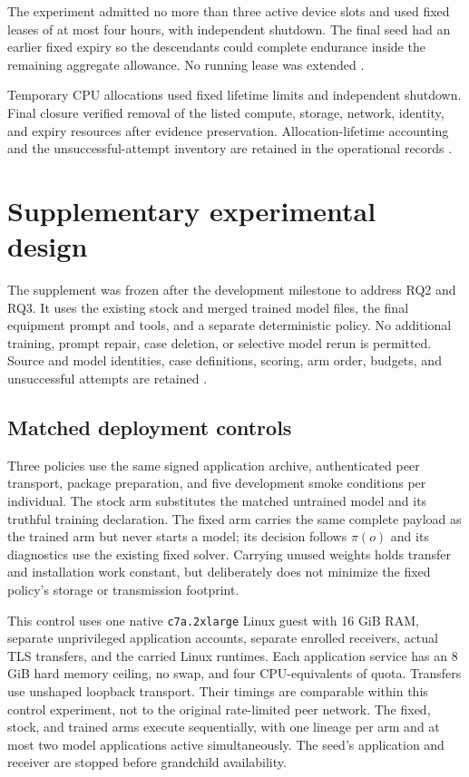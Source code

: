 \documentclass[11pt,letterpaper]{article}
\begin{document}
The experiment admitted no more than three active device slots and used fixed
leases of at most four hours, with independent shutdown. The final seed had
an earlier fixed expiry so the descendants could complete endurance inside the
remaining aggregate allowance. No running lease was extended
\cite{reduced,operations}.

Temporary CPU allocations used fixed lifetime limits and independent shutdown.
Final closure verified removal of the listed compute, storage, network,
identity, and expiry resources after evidence preservation. Allocation-lifetime
accounting and the unsuccessful-attempt inventory are retained in the
operational records \cite{completion,gates}.

\section{Supplementary experimental design}
\label{sec:supplement}

The supplement was frozen after the development milestone to address RQ2 and
RQ3. It uses the existing stock and merged trained model files, the final
equipment prompt and tools, and a separate deterministic policy. No additional
training, prompt repair, case deletion, or selective model rerun is permitted.
Source and model identities, case definitions, scoring, arm order, budgets,
and unsuccessful attempts are retained \cite{holdout,controls,correctedcontrols,mutations}.

\subsection{Matched deployment controls}

Three policies use the same signed application archive, authenticated peer
transport, package preparation, and five development smoke conditions per
individual. The stock arm substitutes the matched untrained model and its
truthful training declaration. The fixed arm carries the same complete payload
as the trained arm but never starts a model; its decision follows $\pi(o)$ and
its diagnostics use the existing fixed solver. Carrying unused weights holds
transfer and installation work constant, but deliberately does not minimize
the fixed policy's storage or transmission footprint.

This control uses one native \texttt{c7a.2xlarge} Linux guest with 16 GiB RAM,
separate unprivileged application accounts, separate enrolled receivers,
actual TLS transfers, and the carried Linux runtimes. Each application service
has an 8 GiB hard memory ceiling, no swap, and four CPU-equivalents of quota.
Transfers use unshaped loopback transport. Their timings are comparable within
this control experiment, not to the original rate-limited peer network.
The fixed, stock, and trained arms execute sequentially, with one lineage per
arm and at most two model applications active simultaneously. The seed's
application and receiver are stopped before grandchild availability.
\end{document}
